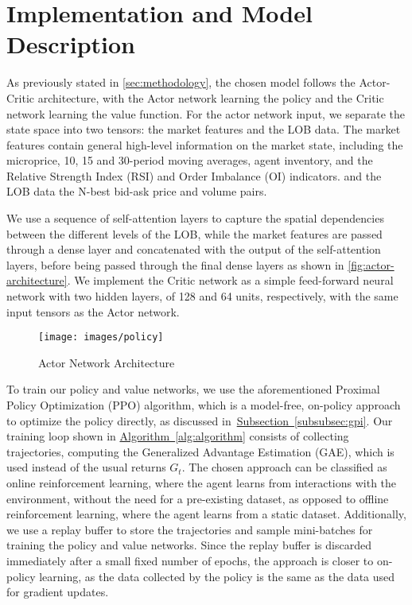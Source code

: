 \section{Implementation and Model Description}
\label{sec:implementation-and-model-description}

As previously stated in \autoref{sec:methodology}, the chosen model follows the Actor-Critic architecture,
with the Actor network learning the policy and the Critic network learning the value function.
For the actor network input, we separate the state space into two tensors: the market features and the LOB data.
The market features contain general high-level information on the market state, including the microprice, 10, 15 and 30-period moving averages, agent inventory, and the Relative Strength Index (RSI) and Order Imbalance (OI) indicators.
and the LOB data the N-best bid-ask price and volume pairs.

We use a sequence of self-attention layers to capture the spatial dependencies between the different levels of the LOB,
while the market features are passed through a dense layer and concatenated with the output of the self-attention layers,
before being passed through the final dense layers as shown in \autoref{fig:actor-architecture}.
We implement the Critic network as a simple feed-forward neural network with two hidden layers, of 128 and 64 units, respectively,
with the same input tensors as the Actor network.

\begin{figure}
    \centering
    \texttt{[image: images/policy]}
    \caption{Actor Network Architecture}
    \label{fig:actor-architecture}
\end{figure}

To train our policy and value networks, we use the aforementioned Proximal Policy Optimization (PPO) algorithm\cite{Schulman2017},
which is a model-free, on-policy approach to optimize the policy directly, as discussed in~\hyperref[subsubsec:gpi]{Subsection~\ref{subsubsec:gpi}}.
Our training loop shown in \hyperref[alg:algorithm]{Algorithm~\ref{alg:algorithm}} consists of collecting trajectories,
computing the Generalized Advantage Estimation (GAE), which is used instead of the usual returns $G_t$.
The chosen approach can be classified as online reinforcement learning, where the agent learns from interactions with the environment,
without the need for a pre-existing dataset, as opposed to offline reinforcement learning, where the agent learns from a static dataset.
Additionally, we use a replay buffer to store the trajectories and sample mini-batches for training the policy and value networks.
Since the replay buffer is discarded immediately after a small fixed number of epochs, the approach is closer to on-policy learning,
as the data collected by the policy is the same as the data used for gradient updates.

